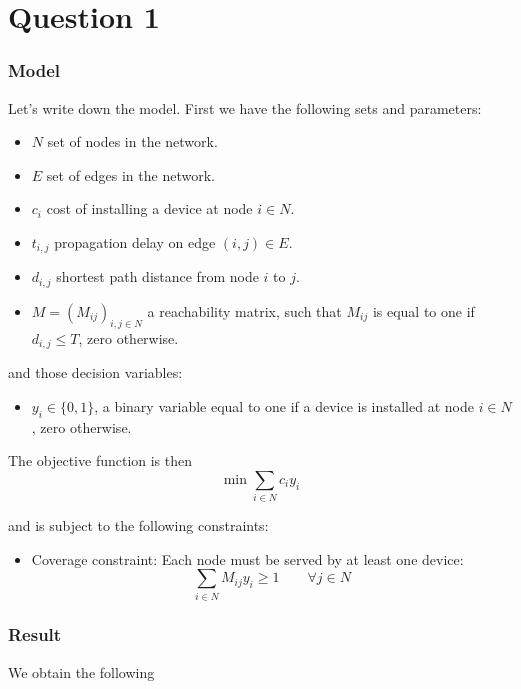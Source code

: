 \section{Question 1}

\subsubsection*{Model}
Let's write down the model. First we have the following sets and parameters:
\begin{itemize}
	\item $N$ set of nodes in the network.
	\item $E$ set of edges in the network.
	\item $c_i$ cost of installing a device at node $i \in N$.
	\item $t_{i,j}$ propagation delay on edge $(i,j) \in E$.
	\item $d_{i,j}$ shortest path distance from node $i$ to $j$.
	\item $M = (M_{ij})_{i,j \in N}$ a reachability matrix, such that $M_{ij}$ is equal to one if $d_{i,j} \le T$, zero otherwise.
\end{itemize}

and those decision variables:
\begin{itemize}
	\item $y_i \in \{0,1\}$, a binary variable equal to one if a device is installed at node $i \in N$, zero otherwise.


\end{itemize}

The objective function is then
\begin{equation}
	\min \sum_{i \in N} c_i y_i
\end{equation}

and is subject to the following constraints:
\begin{itemize}
	\item Coverage constraint: Each node must be served by at least one device:
	\[
		\sum_{i \in N } M_{ij}y_i \ge 1 \qquad \forall j \in N
	\]

	
\end{itemize}

\newpage

\subsubsection*{Result}
We obtain the following

